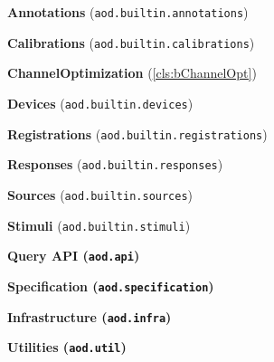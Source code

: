 \documentclass{aodatadocs}
\begin{document}
{\begin{legal}[font=\Large\bfseries, itemsep=1.5ex]
    \begin{legal}[font=\large\bfseries, itemsep=1ex]
        \item {\large\textbf{Annotations} (\texttt{aod.builtin.annotations})}
        \item {\large\textbf{Calibrations} (\texttt{aod.builtin.calibrations})}
        \begin{legal}
            \item \textbf{ChannelOptimization} (\ref{cls:bChannelOpt})
        \end{legal}
        \item {\large\textbf{Devices} (\texttt{aod.builtin.devices})}
        \item {\large\textbf{Registrations} (\texttt{aod.builtin.registrations})}
        \item {\large\textbf{Responses} (\texttt{aod.builtin.responses})}
        \item {\large\textbf{Sources} (\texttt{aod.builtin.sources})}
        \item {\large\textbf{Stimuli} (\texttt{aod.builtin.stimuli})}
    \end{legal}
    \item {\Large\bfseries Query API (\texttt{aod.api})}
    \item {\Large\bfseries Specification (\texttt{aod.specification})}
    \item {\Large\bfseries Infrastructure (\texttt{aod.infra})}
    \item {\Large\bfseries Utilities (\texttt{aod.util})}
\end{legal}
}

\pagebreak
\end{document}
